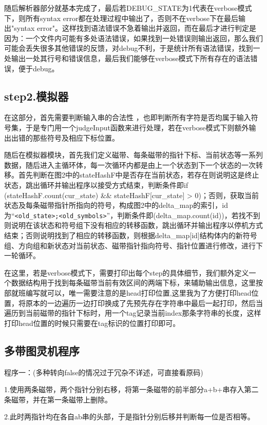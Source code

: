 \documentclass[UTF8]{article}
\begin{document}
随后解析器部分就基本完成了，最后若DEBUG\_STATE为1代表在verbose模式下，则所有syntax error都在处理过程中输出了，否则不在verbose下在最后输出"syntax error"。这样找到语法错误不急着输出并返回，而在最后才进行判定是因为：一个文件内可能有多处语法错误，如果找到一处错误则输出返回，那么我们可能会丢失很多其他错误的反馈，对debug不利，于是统计所有语法错误，找到一处输出一处其行号和错误信息，最后我们能够在verbose模式下所有存在的语法错误，便于debug。

\subsection{step2.模拟器}
在这部分，首先需要判断输入串的合法性 ，也即判断所有字符是否均属于输入符号集，于是专门用一个judgeInput函数来进行处理，若在verbose模式下则额外输出出错的那些符号及相应下标位置。

随后在模拟器模块，首先我们定义磁带、每条磁带的指针下标、当前状态等一系列数据，随后进入主循环体，每一次循环内都是由上一个状态到下一个状态的一次转移。首先判断在图2中的stateHashF中是否存在当前状态，若存在则说明这是终止状态，跳出循环并输出程序以接受方式结束，判断条件即if (stateHashF.count(cur\_state) \&\& stateHashF[cur\_state] > 0)；否则，获取当前状态及每条磁带指针所指向的符号，构成图2中的delta\_map的索引，id为``\verb|<old_state>;<old_symbols>|''，判断条件即(delta\_map.count(id))，若找不到则说明在该状态和符号组下没有相应的转移函数，跳出循环并输出程序以停机方式结束；否则说明找到了相应的转移函数，则根据delta\_map[id]结构体内的新符号组、方向组和新状态对当前状态、磁带指针指向符号、指针位置进行修改，进行下一轮循环。

在这里，若是verbose模式下，需要打印出每个step的具体细节，我们额外定义一个数据结构用于找到每条磁带当前有效区间的两端下标，来辅助输出信息，这里按部就班编写就可以，唯一需要注意的是head打印位置,这里我为了方便打印head位置，将原本的一边遍历一边打印换成了先预先存在字符串中最后一起打印，然后当遍历到当前磁带的指针下标时，用一个tag记录当前index那条字符串的长度，这样打印head位置的时候只需要在tag标识的位置打印即可。

\subsection{多带图灵机程序}
程序一：(多种转向false的情况过于冗杂不详述，可直接看原码)

1.使用两条磁带，两个指针分别右移，将第一条磁带的前半部分a+b+串存入第二条磁带，并在第一条磁带上删除。

2.此时两指针均在各自ab串的头部，于是指针分别后移并判断每一位是否相等。
\end{document}
